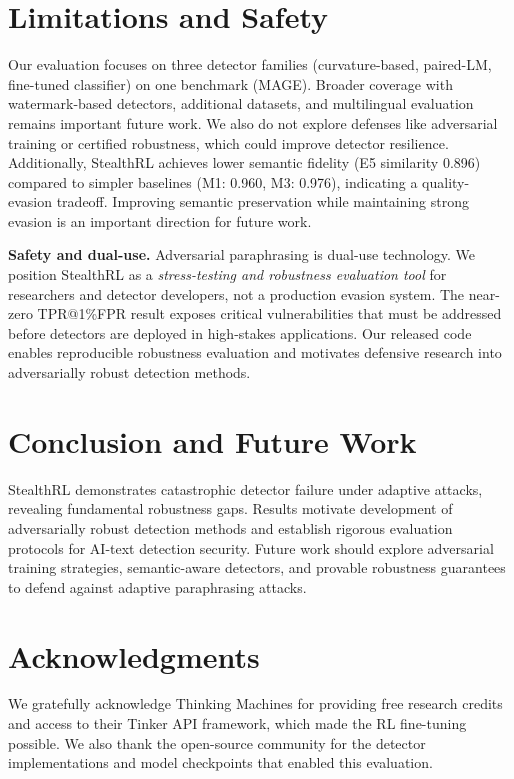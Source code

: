 \documentclass{article} %
\begin{document}
\section{Limitations and Safety}
Our evaluation focuses on three detector families (curvature-based, paired-LM, fine-tuned classifier) on one benchmark (MAGE). Broader coverage with watermark-based detectors, additional datasets, and multilingual evaluation remains important future work. We also do not explore defenses like adversarial training or certified robustness, which could improve detector resilience. Additionally, StealthRL achieves lower semantic fidelity (E5 similarity 0.896) compared to simpler baselines (M1: 0.960, M3: 0.976), indicating a quality-evasion tradeoff. Improving semantic preservation while maintaining strong evasion is an important direction for future work.

\textbf{Safety and dual-use.} Adversarial paraphrasing is dual-use technology. We position StealthRL as a \emph{stress-testing and robustness evaluation tool} for researchers and detector developers, not a production evasion system. The near-zero TPR@1\%FPR result exposes critical vulnerabilities that must be addressed before detectors are deployed in high-stakes applications. Our released code enables reproducible robustness evaluation and motivates defensive research into adversarially robust detection methods.

\section{Conclusion and Future Work}
StealthRL demonstrates catastrophic detector failure under adaptive attacks, revealing fundamental robustness gaps. Results motivate development of adversarially robust detection methods and establish rigorous evaluation protocols for AI-text detection security. Future work should explore adversarial training strategies, semantic-aware detectors, and provable robustness guarantees to defend against adaptive paraphrasing attacks.

\section*{Acknowledgments}
We gratefully acknowledge Thinking Machines for providing free research credits and access to their Tinker API framework, which made the RL fine-tuning possible. We also thank the open-source community for the detector implementations and model checkpoints that enabled this evaluation.
\end{document}
